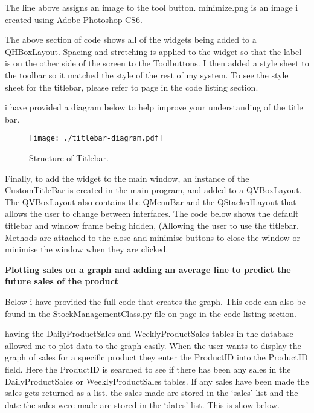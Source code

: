 The line above assigns an image to the tool button. minimize.png is an image i created using Adobe Photoshop CS6.


The above section of code shows all of the widgets being added to a QHBoxLayout. Spacing and stretching is applied to the widget so that the label is on the other side of the screen to the Toolbuttons. I then added a style sheet to the toolbar so it matched the style of the rest of my system. To see the style sheet for the titlebar, please refer to page \pageref{fig:CustomToolbarClass} in the code listing section. \par

i have provided a diagram below to help improve your understanding of the title bar.



\begin{figure}[H]
    \texttt{[image: ./titlebar-diagram.pdf]}
    \caption{Structure of Titlebar.} \label{fig:titlebar-diagram}
\end{figure}

Finally, to add the widget to the main window, an instance of the CustomTitleBar is created in the main program, and added to a QVBoxLayout. The QVBoxLayout also contains the QMenuBar and the QStackedLayout that allows the user to change between interfaces. The code below shows the default titlebar and window frame being hidden, (Allowing the user to use the titlebar. Methods are attached to the close and minimise buttons to close the window or minimise the window when they are clicked.


\textbf{Plotting sales on a graph and adding an average line to predict the future sales of the product}

Below i have provided the full code that creates the graph. This code can also be found in the StockManagementClass.py file on page \pageref{fig:StockManagementClass} in the code listing section.


having the DailyProductSales and WeeklyProductSales tables in the database allowed me to plot data to the graph easily. When the user wants to display the graph of sales for a specific product they enter the ProductID into the ProductID field. Here the ProductID is searched to see if there has been any sales in the DailyProductSales or WeeklyProductSales tables. If any sales have been made the sales gets returned as a list. the sales made are stored in the `sales' list and the date the sales were made are stored in the `dates' list. This is show below.

